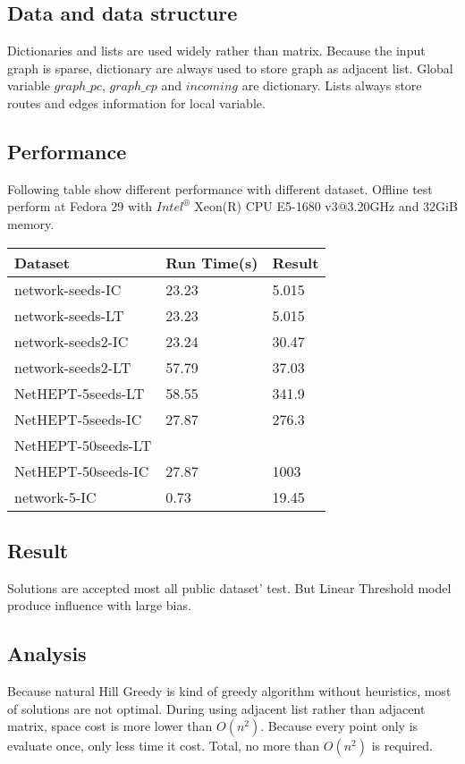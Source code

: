 \documentclass[conference,compsoc]{IEEEtran}
\begin{document}
\subsection{Data and data structure}
Dictionaries and lists are used widely rather than matrix. Because the input graph
is sparse, dictionary are always used to store graph as adjacent list. Global
variable $graph\_pc$, $graph\_cp$ and $incoming$ are dictionary. Lists always
store routes and edges information for local variable.

\subsection{Performance}
Following table show different performance with different dataset. Offline
test perform at Fedora 29 with $Intel^{®}$ Xeon(R) CPU E5-1680 v3@3.20GHz and
32GiB memory.

\begin{center}
   \begin{tabular}{| l | l | l |}
   \hline
    Dataset             &Run Time(s)   &Result   \\ \hline
    network-seeds-IC     & 23.23        & 5.015  \\
    network-seeds-LT     & 23.23        & 5.015  \\
    network-seeds2-IC    & 23.24        & 30.47  \\ 
    network-seeds2-LT    & 57.79        & 37.03  \\
    NetHEPT-5seeds-LT    & 58.55        & 341.9  \\
    NetHEPT-5seeds-IC    & 27.87        & 276.3  \\
    NetHEPT-50seeds-LT    &         &   \\
    NetHEPT-50seeds-IC    & 27.87        & 1003  \\
    network-5-IC         & 0.73         & 19.45  \\
   \hline
   \end{tabular}
\end{center}

\subsection{Result}
% 
Solutions are accepted most all public dataset' test. But Linear Threshold model
produce influence with large bias. 

\subsection{Analysis}
Because natural Hill Greedy is kind of greedy algorithm without heuristics, most
of solutions are not optimal. During using adjacent list rather than adjacent
matrix, space cost is more lower than $O(n^2)$. Because every point only is
evaluate once, only less time it cost. Total, no more than $O(n^2)$ is required.
\end{document}

